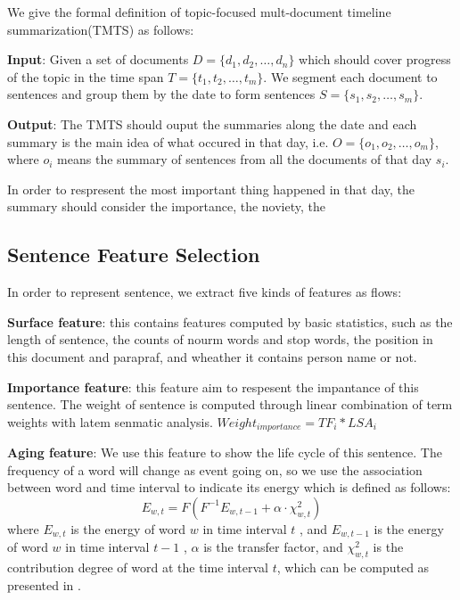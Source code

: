 \documentclass{llncs}
\begin{document}
We give the formal definition of topic-focused mult-document timeline summarization(TMTS) as follows:

\textbf{Input}: Given a set of documents $D=\{d_1, d_2, \dots, d_n\}$ which should cover progress of the topic in the time span $T=\{t_1, t_2, \dots, t_m\}$. We segment each document to sentences and group them by the date to form sentences $S=\{s_1, s_2, \dots, s_m\}$. 

\textbf{Output}: The TMTS should ouput the summaries along the date and each summary is the main idea of what occured in that day, i.e. $O=\{o_1, o_2, \dots, o_m\}$, where $o_i$ means the summary of sentences from all the documents of that day $s_i$. 

In order to respresent the most important thing happened in that day, the summary should consider the importance, the noviety, the  

\subsection{Sentence Feature Selection}

In order to represent sentence, we extract five kinds of features as flows:

\textbf{Surface feature}: this contains features computed by basic statistics, such as the length of sentence, the counts of nourm words and stop words, the position in this document and parapraf, and wheather it contains person name or not. %

\textbf{Importance feature}: this feature aim to respesent the impantance of this sentence. The weight of sentence is computed through linear combination of term weights with latem senmatic analysis. $Weight_{importance} = TF_i * LSA_i$

\textbf{Aging feature}: We use this feature to show the life cycle of this sentence. The frequency of a word will change as event going on, so we use the association between word  and time interval  to indicate its energy which is defined as follows:
\begin{equation}
  E_{w,t} =F(F^{-1}E_{w,t-1}+\alpha\cdot\chi^2_{w,t})
\end{equation}
where $E_{w,t}$ is the energy of word $w$  in time interval $t$ , and $E_{w,t-1}$  is the energy of word $w$ in time interval $t-1$ , $\alpha$ is the transfer factor, and $\chi^2_{w,t}$  is the contribution degree of word  at the time interval $t$, which can be computed as presented in \cite{2000-Swan-p49-56}. 
\end{document}
